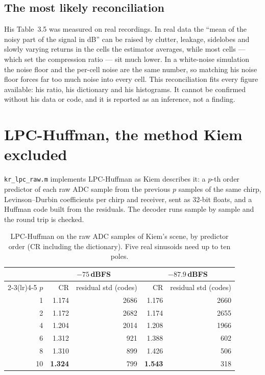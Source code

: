 \subsection{The most likely reconciliation}

His Table~3.5 was measured on real recordings. In real data the ``mean of the
noisy part of the signal in dB'' can be raised by clutter, leakage, sidelobes
and slowly varying returns in the cells the estimator averages, while most cells
--- which set the compression ratio --- sit much lower. In a white-noise
simulation the noise floor and the per-cell noise are the same number, so
matching his noise floor forces far too much noise into every cell. This
reconciliation fits every figure available: his ratio, his dictionary and his
histograms. It cannot be confirmed without his data or code, and it is reported
as an inference, not a finding.

\section{LPC-Huffman, the method Kiem excluded}
\label{sec:kr_lpcraw}

\texttt{kr\_lpc\_raw.m} implements LPC-Huffman as Kiem describes it: a $p$-th
order predictor of each raw ADC sample from the previous $p$ samples of the same
chirp, Levinson--Durbin coefficients per chirp and receiver, sent as 32-bit
floats, and a Huffman code built from the residuals. The decoder runs sample by
sample and the round trip is checked.

\begin{table}[htbp]
\centering
\caption[LPC-Huffman of Meucci and Mancuso by order]{LPC-Huffman on the raw ADC
samples of Kiem's scene, by predictor order (CR including the dictionary). Five
real sinusoids need up to ten poles.}
\label{tab:kr_lpcorder}
\small
\begin{tabular}{@{}rrrrr@{}}
\toprule
& \multicolumn{2}{c}{$-75$\,dBFS} & \multicolumn{2}{c}{$-87.9$\,dBFS}\\
\cmidrule(lr){2-3}\cmidrule(lr){4-5}
$p$ & CR & residual std (codes) & CR & residual std (codes)\\
\midrule
1  & 1.174 & 2686 & 1.176 & 2660\\
2  & 1.172 & 2682 & 1.174 & 2655\\
4  & 1.204 & 2014 & 1.208 & 1966\\
6  & 1.312 & 921  & 1.388 & 602\\
8  & 1.310 & 899  & 1.426 & 506\\
10 & \textbf{1.324} & 799 & \textbf{1.543} & 318\\
\bottomrule
\end{tabular}
\end{table}

